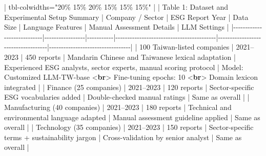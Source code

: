 \documentclass[
  12pt,
]{article}
\newenvironment{Shaded}{\begin{snugshade}}{\end{snugshade}}
\newcommand{\DataTypeTok}[1]{\textcolor[rgb]{0.68,0.00,0.00}{#1}}
\newcommand{\KeywordTok}[1]{\textcolor[rgb]{0.00,0.23,0.31}{\textbf{#1}}}
\newcommand{\NormalTok}[1]{\textcolor[rgb]{0.00,0.23,0.31}{#1}}
\newcommand{\PreprocessorTok}[1]{\textcolor[rgb]{0.68,0.00,0.00}{#1}}
\begin{document}
\begin{Shaded}
\begin{Highlighting}[]
\PreprocessorTok{|}\NormalTok{ tbl{-}colwidths="20\% 15\% 20\% 15\% 15\% 15\%" }\PreprocessorTok{|}
\PreprocessorTok{|}\NormalTok{ Table 1: Dataset and Experimental Setup Summary  }
\PreprocessorTok{|}\NormalTok{ Company / Sector            }\PreprocessorTok{|}\NormalTok{ ESG Report Year }\PreprocessorTok{|}\NormalTok{ Data Size }\PreprocessorTok{|}\NormalTok{ Language Features                         }\PreprocessorTok{|}\NormalTok{ Manual Assessment Details            }\PreprocessorTok{|}\NormalTok{ LLM Settings                      }\PreprocessorTok{|}
\PreprocessorTok{|{-}{-}{-}{-}{-}{-}{-}{-}{-}{-}{-}{-}{-}{-}{-}{-}{-}{-}{-}{-}{-}{-}{-}{-}{-}{-}{-}{-}|{-}{-}{-}{-}{-}{-}{-}{-}{-}{-}{-}{-}{-}{-}{-}{-}{-}|{-}{-}{-}{-}{-}{-}{-}{-}{-}{-}{-}|{-}{-}{-}{-}{-}{-}{-}{-}{-}{-}{-}{-}{-}{-}{-}{-}{-}{-}{-}{-}{-}{-}{-}{-}{-}{-}{-}{-}{-}{-}{-}{-}{-}{-}{-}{-}{-}{-}{-}{-}{-}{-}|{-}{-}{-}{-}{-}{-}{-}{-}{-}{-}{-}{-}{-}{-}{-}{-}{-}{-}{-}{-}{-}{-}{-}{-}{-}{-}{-}{-}{-}{-}{-}{-}{-}{-}{-}{-}|{-}{-}{-}{-}{-}{-}{-}{-}{-}{-}{-}{-}{-}{-}{-}{-}{-}{-}{-}{-}{-}{-}{-}{-}{-}{-}{-}{-}{-}{-}{-}{-}{-}{-}|}
\PreprocessorTok{|}\NormalTok{ 100 Taiwan{-}listed companies }\PreprocessorTok{|}\NormalTok{ 2021–2023       }\PreprocessorTok{|}\NormalTok{ 450 reports }\PreprocessorTok{|}\NormalTok{ Mandarin Chinese and Taiwanese lexical adaptation }\PreprocessorTok{|}\NormalTok{ Experienced ESG analysts, sector experts, manual scoring protocol }\PreprocessorTok{|}\NormalTok{ Model: Customized LLM{-}TW{-}base }\DataTypeTok{\textless{}}\KeywordTok{br}\DataTypeTok{\textgreater{}}\NormalTok{ Fine{-}tuning epochs: 10 }\DataTypeTok{\textless{}}\KeywordTok{br}\DataTypeTok{\textgreater{}}\NormalTok{ Domain lexicon integrated }\PreprocessorTok{|}  
\PreprocessorTok{|}\NormalTok{ Finance (25 companies)     }\PreprocessorTok{|}\NormalTok{ 2021–2023       }\PreprocessorTok{|}\NormalTok{ 120 reports }\PreprocessorTok{|}\NormalTok{ Sector{-}specific ESG vocabularies added   }\PreprocessorTok{|}\NormalTok{ Double{-}checked manual ratings       }\PreprocessorTok{|}\NormalTok{ Same as overall                   }\PreprocessorTok{|}  
\PreprocessorTok{|}\NormalTok{ Manufacturing (40 companies) }\PreprocessorTok{|}\NormalTok{ 2021–2023       }\PreprocessorTok{|}\NormalTok{ 180 reports }\PreprocessorTok{|}\NormalTok{ Technical and environmental language adapted }\PreprocessorTok{|}\NormalTok{ Manual assessment guideline applied }\PreprocessorTok{|}\NormalTok{ Same as overall                   }\PreprocessorTok{|}  
\PreprocessorTok{|}\NormalTok{ Technology (35 companies)   }\PreprocessorTok{|}\NormalTok{ 2021–2023       }\PreprocessorTok{|}\NormalTok{ 150 reports }\PreprocessorTok{|}\NormalTok{ Sector{-}specific terms + sustainability jargon }\PreprocessorTok{|}\NormalTok{ Cross{-}validation by senior analyst  }\PreprocessorTok{|}\NormalTok{ Same as overall                   }\PreprocessorTok{|}


\end{Highlighting}
\end{Shaded}
\end{document}
